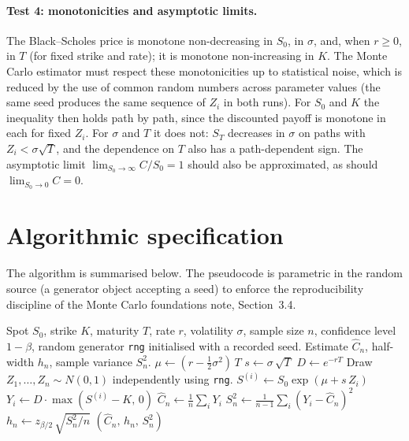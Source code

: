 \documentclass[11pt,a4paper]{article}
\theoremstyle{plain}
\theoremstyle{definition}
\theoremstyle{remark}
\begin{document}
\paragraph{Test 4: monotonicities and asymptotic limits.}
The Black--Scholes price is monotone non-decreasing in $S_0$, in
$\sigma$, and, when $r \geq 0$, in $T$ (for fixed strike and rate); it
is monotone non-increasing in $K$. The Monte Carlo estimator must
respect these monotonicities up to statistical noise, which is reduced
by the use of common random numbers across parameter values (the same
seed produces the same sequence of $Z_i$ in both runs). For $S_0$ and
$K$ the inequality then holds path by path, since the discounted payoff
is monotone in each for fixed $Z_i$. For $\sigma$ and $T$ it does not:
$S_T$ decreases in $\sigma$ on paths with $Z_i < \sigma\sqrt{T}$, and
the dependence on $T$ also has a path-dependent sign. The asymptotic
limit
$\lim_{S_0 \to \infty} C / S_0 = 1$ should also be approximated, as
should $\lim_{S_0 \to 0} C = 0$.

\section{Algorithmic specification}
\label{sec:algorithm}

The algorithm is summarised below. The pseudocode is parametric in the
random source (a generator object accepting a seed) to enforce the
reproducibility discipline of the Monte Carlo foundations note, Section~3.4.

\begin{algorithm}[H]
\caption{Vanilla Monte Carlo for the European call (exact GBM)}
\label{alg:mc-vanilla}
\begin{algorithmic}[1]
\Require Spot $S_0$, strike $K$, maturity $T$, rate $r$, volatility
$\sigma$, sample size $n$, confidence level $1-\beta$, random
generator \texttt{rng} initialised with a recorded seed.
\Ensure Estimate $\hat{C}_n$, half-width $h_n$, sample variance
$S_n^2$.
\State $\mu \gets (r - \tfrac{1}{2}\sigma^2)\, T$ 
\State $s \gets \sigma\, \sqrt{T}$ 
\State $D \gets e^{-rT}$ 
\State Draw $Z_1, \dots, Z_n \sim N(0,1)$ independently using
\texttt{rng}.
  \State $S^{(i)} \gets S_0 \exp(\mu + s\, Z_i)$
  \State $Y_i \gets D \cdot \max(S^{(i)} - K,\, 0)$
\EndFor
\State $\hat{C}_n \gets \frac{1}{n} \sum_i Y_i$
\State $S_n^2 \gets \frac{1}{n-1} \sum_i (Y_i - \hat{C}_n)^2$
\State $h_n \gets z_{\beta/2}\, \sqrt{S_n^2 / n}$
\State \Return $(\hat{C}_n,\, h_n,\, S_n^2)$
\end{algorithmic}
\end{algorithm}
\end{document}
